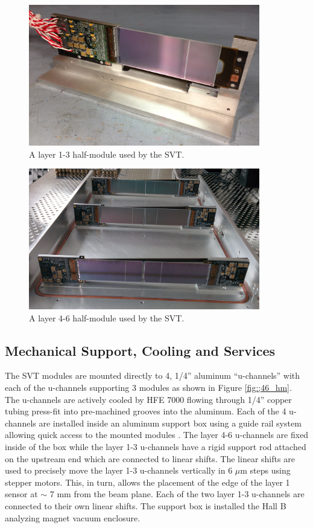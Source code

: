 \begin{figure}
    \centering
    \includegraphics[width=0.9\textwidth]{images/l13_half_module.jpg}
    \caption{A layer 1-3 half-module used by the SVT. }
    \label{fig:l13_hm}
\end{figure}
\begin{figure}
    \centering
    \includegraphics[width=0.9\textwidth]{images/l46_half_module.jpg}
    \caption{A layer 4-6 half-module used by the SVT. }
    \label{fig:l46_hm}
\end{figure}


\subsection{Mechanical Support, Cooling and Services}

The SVT modules are mounted directly to 4,  1/4'' aluminum ``u-channels'' with each
of the u-channels supporting 3 modules as shown in Figure \ref{fig:;46_hm}.  
The u-channels are actively cooled by HFE 7000 flowing through 1/4'' copper 
tubing press-fit into pre-machined grooves into the aluminum. Each of the 4 
u-channels are installed inside an aluminum support box using a guide rail system
allowing quick access to the mounted modules 
.  The layer 
4-6 u-channels are fixed inside of the box while the layer 1-3 u-channels 
have a rigid support rod attached on the upstream end which are connected to 
linear shifts. The linear shifts are used to precisely move the layer 1-3 
u-channels vertically in 6 $\mu$m steps using stepper motors.  This, in turn, 
allows the placement of the edge of the layer 1 sensor at $\sim$ 7 mm from the 
beam plane.  Each of the two layer 1-3 u-channels are connected to their own 
linear shifts.  The support box is installed the Hall B analyzing magnet 
vacuum enclosure. 

